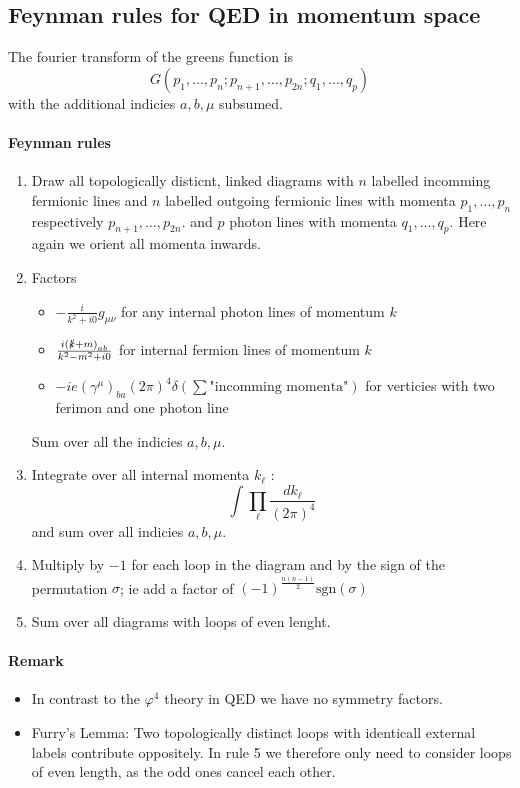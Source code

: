 \documentclass{report}
\begin{document}
\subsection{Feynman rules for QED in momentum space}
The fourier transform of the greens function is \[
G\left( p_1,\ldots,p_n; p_{n+1} ,\ldots,p_{2n} ; q_1,\ldots,q_p \right) 
\] with the additional indicies $a,b,\mu$ subsumed.
\paragraph{Feynman rules}
\begin{enumerate}
  \item Draw all topologically disticnt, linked diagrams with $n$ labelled incomming fermionic lines and $n$ labelled outgoing fermionic lines with momenta $p_1,\ldots,p_n$ respectively $p_{n+1} ,\ldots, p_{2n} $. and $p$ photon lines with momenta $q_1,\ldots,q_p$. Here again we orient all momenta inwards.
  \item Factors 
    \begin{itemize}
      \item $-\frac{i}{k^2 + i 0} g_{\mu\nu} $ for any internal photon lines of momentum $k$
      \item $\frac{i \left( \slashed{k} + m  \right)_{ab} }{k^2 - m^2 + i 0} $ for internal fermion lines of momentum $k$
      \item $-ie \left( \gamma^{\mu} \right)_{ba} \left( 2\pi \right) ^{4} \delta\left( \sum   \text{"incomming momenta"} \right)  $ for verticies with two ferimon and one photon line
    \end{itemize}
    Sum over all the indicies $a, b, \mu$.
  \item Integrate over all internal momenta $k_\ell$ : \[
  \int_{}^{} \prod_{\ell}^{} \frac{dk_\ell}{\left( 2\pi \right) ^{4} }   
  \] and sum over all indicies $a,b,\mu$.
  \item Multiply by $-1$ for each loop in the diagram and by the sign of the permutation $\sigma$; ie add a factor of $\left( -1 \right) ^{\frac{n \left( n-1 \right) }{2} } \text{sgn}\left( \sigma \right) $
  \item Sum over all diagrams with loops of even lenght.
\end{enumerate}
\paragraph{Remark}
\begin{itemize}
  \item In contrast to the $\varphi^{4} $ theory in QED we have no symmetry factors.
  \item Furry's Lemma: Two topologically distinct loops with identicall external labels contribute oppositely. In rule 5 we therefore only need to consider loops of even length, as the odd ones cancel each other.
\end{itemize}
\end{document}

